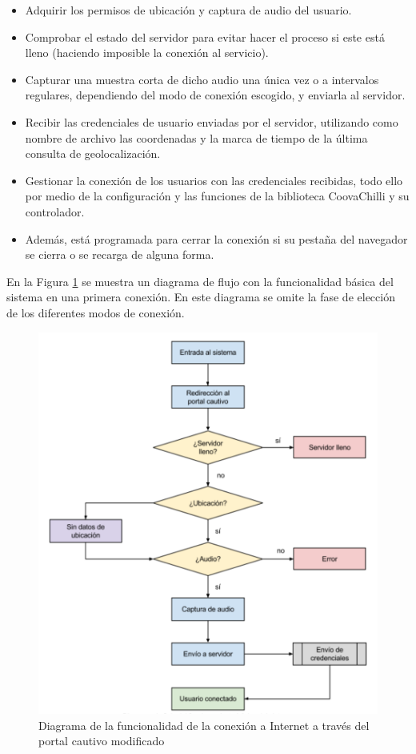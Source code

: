 \begin{itemize}
\item Adquirir los permisos de ubicación y captura de audio del usuario.
\item Comprobar el estado del servidor para evitar hacer el proceso si este está lleno (haciendo imposible la conexión al servicio).
\item Capturar una muestra corta de dicho audio una única vez o a intervalos regulares, dependiendo del modo de conexión escogido, y enviarla al servidor.
\item Recibir las credenciales de usuario enviadas por el servidor, utilizando como nombre de archivo las coordenadas y la marca de tiempo de la última consulta de geolocalización.
\item Gestionar la conexión de los usuarios con las credenciales recibidas, todo ello por medio de la configuración y las funciones de la biblioteca CoovaChilli y su controlador.
\item Además, está programada para cerrar la conexión si su pestaña del navegador se cierra o se recarga de alguna forma.
\end{itemize}

En la Figura \ref{flujoSistema} se muestra un diagrama de flujo con la funcionalidad básica del sistema en una primera conexión. En este diagrama se omite la fase de elección de los diferentes modos de conexión.

\begin{figure}[!t]
\begin{center}
\includegraphics[width=0.75\linewidth]{./4_AnalisisFuncional/Img/flujoSistema.png}
\end{center}
\caption{Diagrama de la funcionalidad de la conexión a Internet a través del portal cautivo modificado}
\label{flujoSistema}
\end{figure}

